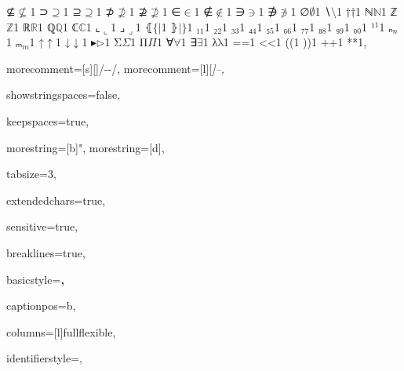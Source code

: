 {{⊈}{{\ensuremath{\nsubseteq}}}1
{⊃}{{\ensuremath{\supseteq}}}1
{⊇}{{\ensuremath{\supseteq}}}1
{⊅}{{\ensuremath{\nsupseteq}}}1
{⊉}{{\ensuremath{\nsupseteq}}}1
{∈}{{\ensuremath{\in}}}1
{∉}{{\ensuremath{\notin}}}1
{∋}{{\ensuremath{\ni}}}1
{∌}{{\ensuremath{\notni}}}1
{∅}{{\ensuremath{\emptyset}}}1
{∖}{{\ensuremath{\setminus}}}1
{†}{{\ensuremath{\dag}}}1
{ℕ}{{\ensuremath{\mathbb{N}}}}1
{ℤ}{{\ensuremath{\mathbb{Z}}}}1
{ℝ}{{\ensuremath{\mathbb{R}}}}1
{ℚ}{{\ensuremath{\mathbb{Q}}}}1
{ℂ}{{\ensuremath{\mathbb{C}}}}1
{⌞}{{\ensuremath{\llcorner}}}1
{⌟}{{\ensuremath{\lrcorner}}}1
{⦃}{{\ensuremath{ \{\!| }}}1
{⦄}{{\ensuremath{ |\!\} }}}1
{₁}{{\ensuremath{_1}}}1
{₂}{{\ensuremath{_2}}}1
{₃}{{\ensuremath{_3}}}1
{₄}{{\ensuremath{_4}}}1
{₅}{{\ensuremath{_5}}}1
{₆}{{\ensuremath{_6}}}1
{₇}{{\ensuremath{_7}}}1
{₈}{{\ensuremath{_8}}}1
{₉}{{\ensuremath{_9}}}1
{₀}{{\ensuremath{_0}}}1
{¹}{{\ensuremath{^1}}}1
{ₙ}{{\ensuremath{_n}}}1
{ₘ}{{\ensuremath{_m}}}1
{↑}{{\ensuremath{\uparrow}}}1
{↓}{{\ensuremath{\downarrow}}}1
{▸}{{\ensuremath{\triangleright}}}1
{Σ}{{\color{symbolcolor}\ensuremath{\Sigma}}}1
{Π}{{\color{symbolcolor}\ensuremath{\Pi}}}1
{∀}{{\color{symbolcolor}\ensuremath{\forall}}}1
{∃}{{\color{symbolcolor}\ensuremath{\exists}}}1
{λ}{{\color{symbolcolor}\ensuremath{\mathrm{\lambda}}}}1
{=}{{\color{symbolcolor}=}}1
{<}{{\color{symbolcolor}<}}1
{(}{(}1
{)}{)}1
{+}{{\color{symbolcolor}+}}1
{*}{{\color{symbolcolor}*}}1,

morecomment=[s][\color{commentcolor}]{/-}{-/},
morecomment=[l][\itshape \color{commentcolor}]{--},

showstringspaces=false,

keepspaces=true,

morestring=[b]",
morestring=[d],

tabsize=3,

extendedchars=true,

sensitive=true,

breaklines=true,

basicstyle=\bf\ttfamily\originalfootnotesize,

captionpos=b,

columns=[l]fullflexible,


identifierstyle={\ttfamily\color{black}},

}
